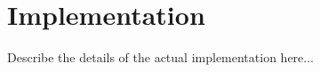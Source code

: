 \chapter{Implementation}
\label{cha:implementation}

Describe the details of the actual implementation here...